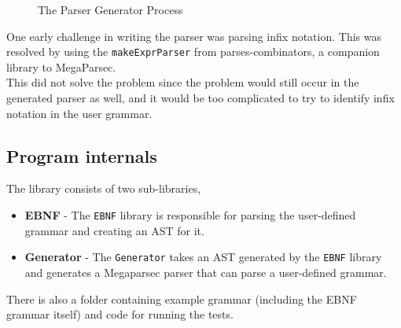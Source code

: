 \documentclass{article}
\begin{document}
\begin{figure}[H]
    \centering
    \caption{The Parser Generator Process}
    \label{fig:process}
\end{figure}

One early challenge in writing the parser was parsing infix notation. This was resolved by using the \texttt{makeExprParser} from parses-combinators\cite{parsercombinators}, a companion library to MegaParsec.\\
This did not solve the problem since the problem would still occur in the generated parser as well, and it would be too complicated to try to identify infix notation in the user grammar.\\

\subsection{Program internals}
The library consists of two sub-libraries,
    \begin{itemize}
        \item \textbf{EBNF} - The \texttt{EBNF} library is responsible for parsing the user-defined grammar and creating an AST for it.
        \item \textbf{Generator} - The \texttt{Generator} takes an AST generated by the \texttt{EBNF} library and generates a Megaparsec parser that can parse a user-defined grammar. 
    \end{itemize}

There is also a folder containing example grammar (including the EBNF grammar itself) and code for running the tests.
\end{document}
